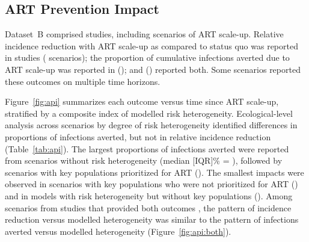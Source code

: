 \subsection{ART Prevention Impact}
\label{ss:res:api}
Dataset~B comprised  studies,
including  scenarios of ART scale-up.
Relative incidence reduction with ART scale-up
as compared to status quo
was reported in  studies ( scenarios);
the proportion of cumulative infections averted due to ART scale-up
was reported in  ();
and  () reported both.
Some scenarios reported these outcomes on multiple time horizons.
\par
Figure~\ref{fig:api} summarizes each outcome versus time since ART scale-up,
stratified by a composite index of modelled risk heterogeneity.
Ecological-level analysis across scenarios by degree of risk heterogeneity
identified differences in proportions of infections averted,
but not in relative incidence reduction (Table~\ref{tab:api}).
The largest proportions of infections averted were reported from
scenarios without risk heterogeneity (median [IQR]\% = ), followed by
scenarios with key populations prioritized for ART ().
The smallest impacts were observed in scenarios with
key populations who were not prioritized for ART ()
and in models with risk heterogeneity but without key populations
().
Among  scenarios from  studies that provided both outcomes
\cite{Salomon2005,Abbas2006,Pretorius2010,Nichols2014,Barnighausen2016,Maheu-Giroux2017,Akudibillah2018}, %
the pattern of incidence reduction versus modelled heterogeneity
was similar to the pattern of infections averted versus modelled heterogeneity
(Figure~\ref{fig:api:both}).
